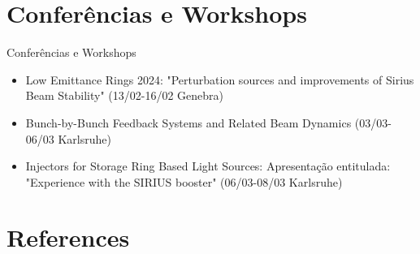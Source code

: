 \documentclass{beamer}					  %
\begin{document}
\section{Conferências e Workshops}

\begin{frame}{Conferências e Workshops}
    \begin{itemize}
            \item Low Emittance Rings 2024: "Perturbation sources and improvements of Sirius Beam Stability" (13/02-16/02 Genebra)
            \item Bunch-by-Bunch Feedback Systems and Related Beam Dynamics (03/03-06/03 Karlsruhe)
            \item Injectors for Storage Ring Based Light Sources: Apresentação entitulada: "Experience with the SIRIUS booster" (06/03-08/03 Karlsruhe)
    \end{itemize}
\end{frame}





\section{References}
\end{document}
